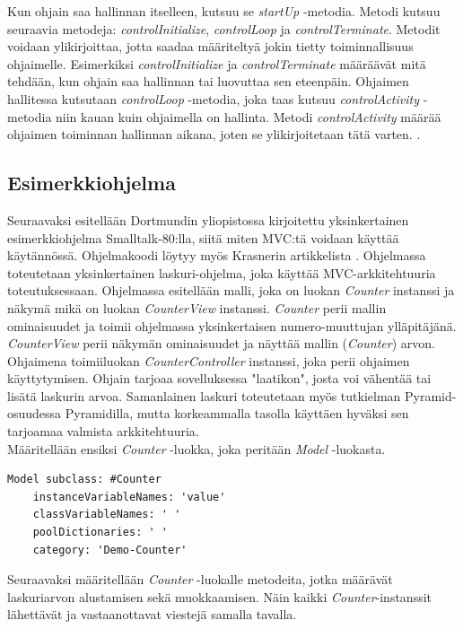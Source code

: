 \documentclass[finnish,utf8,nonumbib,palatino,kandi]{gradu2}
\begin{document}
Kun ohjain saa hallinnan itselleen, kutsuu se \emph{startUp} -metodia. Metodi kutsuu seuraavia metodeja: \emph{controlInitialize}, \emph{controlLoop} ja \emph{controlTerminate}. Metodit
voidaan ylikirjoittaa, jotta saadaa määriteltyä jokin tietty toiminnallisuus ohjaimelle. Esimerkiksi \emph{controlInitialize} ja \emph{controlTerminate} määräävät mitä tehdään, kun ohjain saa hallinnan tai luovuttaa sen eteenpäin. Ohjaimen hallitessa kutsutaan
\emph{controlLoop} -metodia, joka taas kutsuu \emph{controlActivity} -metodia niin kauan kuin ohjaimella on hallinta.  Metodi \emph{controlActivity} määrää ohjaimen toiminnan hallinnan aikana, joten se ylikirjoitetaan tätä varten. \cite{Krasner:desc}. 


\subsection{Esimerkkiohjelma}
Seuraavaksi esitellään  Dortmundin yliopistossa kirjoitettu yksinkertainen esimerkkiohjelma Smalltalk-80:lla, siitä miten MVC:tä voidaan käyttää
käytännössä. Ohjelmakoodi löytyy myös Krasnerin artikkelista \cite{Krasner:desc}. Ohjelmassa toteutetaan yksinkertainen laskuri-ohjelma, joka käyttää MVC-arkkitehtuuria toteutuksessaan. Ohjelmassa esitellään malli, joka on luokan \emph{Counter} instanssi ja näkymä mikä on luokan \emph{CounterView} instanssi. \emph{Counter} perii mallin ominaisuudet ja 
toimii ohjelmassa yksinkertaisen numero-muuttujan ylläpitäjänä. \emph{CounterView} perii näkymän ominaisuudet ja näyttää mallin (\emph{Counter}) arvon.
Ohjaimena toimiiluokan \emph{CounterController} instanssi, joka perii ohjaimen käyttytymisen. Ohjain tarjoaa sovelluksessa "laatikon", josta voi vähentää
tai lisätä laskurin arvoa. Samanlainen laskuri toteutetaan myös tutkielman Pyramid-osuudessa Pyramidilla, mutta korkeammalla tasolla käyttäen hyväksi
sen tarjoamaa valmista arkkitehtuuria.  \\

Määritellään ensiksi \emph{Counter} -luokka, joka peritään \emph{Model} -luokasta.
\begin{lstlisting}[language=Smalltalk]
Model subclass: #Counter
	instanceVariableNames: 'value'
	classVariableNames: ' '
	poolDictionaries: ' '
  	category: 'Demo-Counter'
\end{lstlisting} 

Seuraavaksi määritellään \emph{Counter} -luokalle metodeita, jotka määrävät
laskuriarvon alustamisen sekä muokkaamisen. Näin kaikki \emph{Counter}-instanssit
lähettävät ja vastaanottavat viestejä samalla tavalla.
\end{document}
